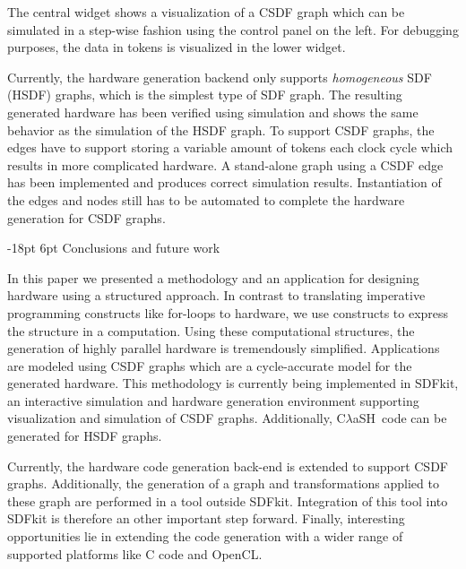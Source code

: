 \makeatother\documentclass[10pt,english,oneside,twocolumn,a4paper]{article}%
\makeatletter
\newcommand{\clash}{C$\lambda$aSH}
\renewcommand\section{\@startsection {section}{1}{\z@}%
                                   {-18pt}%
                                   {6pt}%
                                   {\Large\bfseries\RaggedRight}}
\makeatother
\begin{document}
  The central widget shows a visualization of a CSDF graph which can be simulated in a step-wise fashion using the control panel on the left.
  For debugging purposes, the data in tokens is visualized in the lower widget.

  Currently, the hardware generation backend only supports \emph{homogeneous} SDF (HSDF) graphs, which is the simplest type of SDF graph.
  The resulting generated hardware has been verified using simulation and shows the same behavior as the simulation of the HSDF graph.
  To support CSDF graphs, the edges have to support storing a variable amount of tokens each clock cycle which results in more complicated hardware.
  A stand-alone graph using a CSDF edge has been implemented and produces correct simulation results.
  Instantiation of the edges and nodes still has to be automated to complete the hardware generation for CSDF graphs.

\section{Conclusions and future work}
\label{sec:conclusions}

  In this paper we presented a methodology and an application for designing hardware using a structured approach.
  In contrast to translating imperative programming constructs like for-loops to hardware, we use constructs to express the structure in a computation.
  Using these computational structures, the generation of highly parallel hardware is tremendously simplified.
  Applications are modeled using CSDF graphs which are a cycle-accurate model for the generated hardware.
  This methodology is currently being implemented in SDFkit, an interactive simulation and hardware generation environment supporting visualization and simulation of CSDF graphs.
  Additionally, \clash\ code can be generated for HSDF graphs.

  Currently, the hardware code generation back-end is extended to support CSDF graphs.
  Additionally, the generation of a graph and transformations applied to these graph are performed in a tool outside SDFkit.
  Integration of this tool into SDFkit is therefore an other important step forward.
  Finally, interesting opportunities lie in extending the code generation with a wider range of supported platforms like C code and OpenCL.
\end{document}

